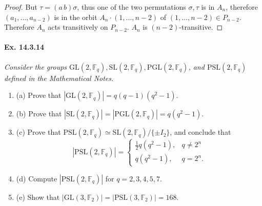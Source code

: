 \documentclass[11pt,a4paper]{article}
\newcommand{\be} {\begin{enumerate}}
\newcommand{\ee} {\end{enumerate}}
\newcommand{\F}{\mathbb{F}}
\begin{document}
\begin{proof}
But $\tau = (a\, b) \sigma$, thus one of the two permutations $\sigma, \tau$ is in $A_n$, therefore $(a_1,\ldots,a_{n-2}) $ is in the orbit $A_n\cdot (1,\ldots,n-2)$ of $(1,\ldots,n-2) \in P_{n-2}$. Therefore $A_n$ acts transitively on $P_{n-2}$. $A_n$ is $(n-2)$-transitive.
  \end{proof}
 
 
  \paragraph{Ex. 14.3.14}{\it Consider the groups $\mathrm{GL}(2,\F_q), \mathrm{SL}(2,\F_q), \mathrm{PGL}(2,\F_q)$, and $\mathrm{PSL}(2,\F_q)$ defined in the Mathematical Notes.
  \be
  \item[(a)] Prove that $|\mathrm{GL}(2,\F_q)| = q(q-1)(q^2-1)$.
  \item[(b)] Prove that $|\mathrm{SL}(2,\F_q)|= | \mathrm{PGL}(2,\F_q)| = q(q^2-1)$.
  \item[(c)] Prove that $\mathrm{PSL}(2,\F_q) \simeq \mathrm{SL}(2,\F_q)/\{\pm I_2\}$, and conclude that
  $$|\mathrm{PSL}(2,\F_q)| = 
  \left\{
  \begin{array}{ll}
  \frac{1}{2} q (q^2-1),&q\ne 2^n\\
  q(q^2-1), & q=2^n.
  \end{array}
  \right.
  $$
  \item[(d)] Compute $|\mathrm{PSL}(2,\F_q)|$ for $q=2,3,4,5,7$.
  \item[(e)] Show that $|\mathrm{GL}(3,\F_2)| = |\mathrm{PSL}(3,\F_2)| = 168$.
  \ee
  }
\end{document}
